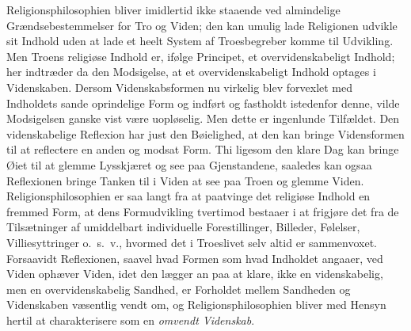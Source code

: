 \documentclass[12pt]{book}
\begin{document}
Religionsphilosophien bliver imidlertid ikke staaende ved
almindelige Grændsebestemmelser for Tro og Viden; den kan umulig
lade Religionen udvikle sit Indhold uden at lade et heelt System af
Troesbegreber komme til Udvikling. Men Troens religiøse Indhold er,
ifølge Principet, et overvidenskabeligt Indhold; her indtræder da
den Modsigelse, at et overvidenskabeligt Indhold optages i
Videnskaben. Dersom Videnskabsformen nu virkelig blev forvexlet med
Indholdets sande oprindelige Form og indført og fastholdt istedenfor
denne, vilde Modsigelsen ganske vist være uopløselig. Men dette er
ingenlunde Tilfældet. Den videnskabelige Reflexion har just den
Bøielighed, at den kan bringe Vidensformen til at reflectere en
anden og modsat Form. Thi ligesom den klare Dag kan bringe Øiet til
at glemme Lysskjæret og see paa Gjenstandene, saaledes kan ogsaa
Reflexionen bringe Tanken til i Viden at see paa Troen og glemme
Viden. Religionsphilosophien er saa langt fra at paatvinge det
religiøse Indhold en fremmed Form, at dens Formudvikling tvertimod
bestaaer i at frigjøre det fra de Tilsætninger af umiddelbart
individuelle Forestillinger, Billeder, Følelser, Villiesyttringer
o.\ s.\ v., hvormed det i Troeslivet selv altid er sammenvoxet.
Forsaavidt Reflexionen, saavel hvad Formen som hvad Indholdet
angaaer, ved Viden ophæver Viden,
idet den lægger an paa at klare, ikke en videnskabelig, men en
overvidenskabelig Sandhed, er Forholdet mellem Sandheden og
Videnskaben væsentlig vendt om, og Religionsphilosophien bliver med
Hensyn hertil at charakterisere som en \emph{omvendt Videnskab}.
\end{document}
